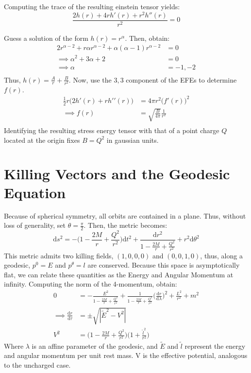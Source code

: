 \documentclass{article}
\newcommand*\dif{\mathrm{d}}
\begin{document}
Computing the trace of the resulting einstein tensor yields:
\begin{equation*}
   \frac{2h(r) + 4rh'(r)+r^2h''(r)}{r^2} = 0
\end{equation*}

Guess a solution of the form $h(r) = r^{\alpha}$. Then, obtain:
\begin{align*}
   2r^{\alpha - 2} + r\alpha r^{\alpha - 2} + \alpha(\alpha - 1)r^{\alpha - 2} &= 0 \\
   \implies \alpha^2 + 3\alpha + 2 &= 0 \\
   \implies \alpha &= -1, -2 \\
\end{align*}
Thus, $h(r) = \frac{A}{r} + \frac{B}{r^2}$. Now, use the $3,3$ component of the EFEs to determine $f(r)$.
\begin{align*}
   \frac{1}{2} r\big(2h'(r) + rh' '(r)\big) &= 4\pi r^2 \big(f'(r)\big)^2 \\
   \implies f(r) &= \sqrt{\frac{B}{4\pi}}\frac{1}{r^2} \\
\end{align*}
Identifying the resulting stress energy tensor with that of a point charge $Q$ located at the origin fixes $B = Q^2$ in gaussian units.
\section{Killing Vectors and the Geodesic Equation}
Because of spherical symmetry, all orbits are contained in a plane. Thus, without loss of generality, set $\theta = \frac{\pi}{2}$. Then, the metric becomes:
\begin{equation*}
   \dif s^2 = -\big(1 - \frac{2M}{r} + \frac{Q^2}{r^2}\big)\dif t^2 + \frac{\dif r^2}{1 - \frac{2M}{r} + \frac{Q^2}{r^2}} + r^2\dif \theta^2
\end{equation*}
This metric admits two killing fields, $(1,0,0,0)$ and $(0,0,1,0)$, thus, along a geodesic, $p^0 = E$ and $p^{\theta} = l$ are conserved. Because this space is asymptotically flat, we can relate these quantities as the Energy and Angular Momentum at infinity. Computing the norm of the 4-momentum, obtain:
\begin{align*}
   0 &= -\frac{E^2}{1 - \frac{2M}{r} + \frac{Q^2}{r^2}} + \frac{1}{1 - \frac{2M}{r} + \frac{Q^2}{r^2}}\big(\frac{\dif r}{\dif \lambda}\big)^2 + \frac{L^2}{r^2} + m^2 \\
   \implies \frac{\dif r}{\dif \tau} &= \pm \sqrt{|\tilde{E}^2 - V^2|} \\
   V^2 &= \big(1 - \frac{2M}{r} + \frac{Q^2}{r^2}\big)\big(1 + \frac{\tilde{l}^2}{r^2}\big)
\end{align*}
Where $\lambda$ is an affine parameter of the geodesic, and $\tilde{E}$ and $\tilde{l}$ represent the energy and angular momentum per unit rest mass. V is the effective potential, analogous to the uncharged case. 
\end{document}
